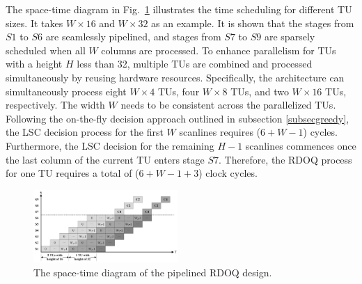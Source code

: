 \documentclass[lettersize,journal]{IEEEtran}
\begin{document}
The space-time diagram in Fig.~\ref{timing diagram} illustrates the time scheduling for different TU sizes. It takes $W\times16$ and $W\times32$ as an example. It is shown that the stages from $S1$ to $S6$ are seamlessly pipelined, and stages from $S7$ to $S9$ are sparsely scheduled when all $W$ columns are processed. 
To enhance parallelism for TUs with a height $H$ less than 32, multiple TUs are combined and processed simultaneously by reusing hardware resources. Specifically, the architecture can simultaneously process eight $W\times4$ TUs, four $W\times8$ TUs, and two $W\times16$ TUs, respectively. The width $W$ needs to be consistent across the parallelized TUs. 
Following the on-the-fly decision approach outlined in subsection \ref{subsecgreedy}, the LSC decision process for the first $W$ scanlines requires ($6 + W - 1$) cycles. Furthermore, the LSC decision for the remaining $H-1$ scanlines commences once the last column of the current TU enters stage $S7$. Therefore, the RDOQ process for one TU requires a total of ($6 + W - 1 + 3$) clock cycles. 
\begin{figure}[!hb]
	\centering
    \vspace{-2pt}
	\centerline{\includegraphics[width=0.49\textwidth]{figure/timing diagram.png}}
    \vspace{-2pt}
	\caption{The space-time diagram of the pipelined RDOQ design.}
	\label{timing diagram} %
\end{figure}


\end{document}
